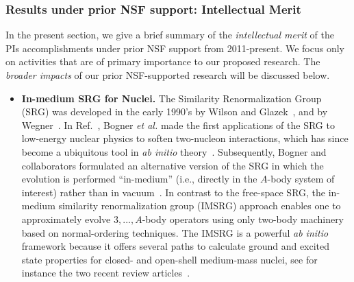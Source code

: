 \subsubsection{Results under prior NSF support: Intellectual Merit  }
In the present section, we give a brief summary of the \emph{intellectual merit} of the PIs accomplishments under prior NSF support from 2011-present.  We focus only on activities that are of primary importance to our proposed research. The \emph{broader impacts} of our prior NSF-supported research will be discussed below.
\begin{itemize}

\item{\bf In-medium SRG for Nuclei.} The Similarity
Renormalization Group (SRG) was developed in the early 1990's by
Wilson and Glazek~\cite{Glazek:1993il}, and by
Wegner~\cite{Wegner:1994dk}. In Ref.~\cite{Bogner:2006pc}, Bogner \emph{et al.} 
made the first applications of the SRG to low-energy nuclear
physics to soften two-nucleon interactions, which has since become a ubiquitous tool in \emph{ab initio} theory~\cite{Bogner:2010pq,Binder:2013zr,Hupin:2013uq,Roth:2011kx}.  Subsequently, Bogner and collaborators formulated an alternative version of the SRG  in which the evolution is performed ``in-medium'' (i.e., directly in the $A$-body system of interest) rather than in vacuum~\cite{Tsukiyama:2011uq, Tsukiyama:2012fk}.  In contrast to the free-space SRG, the
in-medium similarity renormalization group (IMSRG) approach enables one to approximately evolve $3,...,A$-body operators
using only two-body machinery based on normal-ordering
techniques. The IMSRG is a powerful \emph{ab initio} framework because it offers several paths to calculate ground and excited state properties for closed- and open-shell medium-mass nuclei, see for instance the two recent review articles~\cite{Hergert:2015awm,Hergert:2016etg}. 



\end{itemize}
